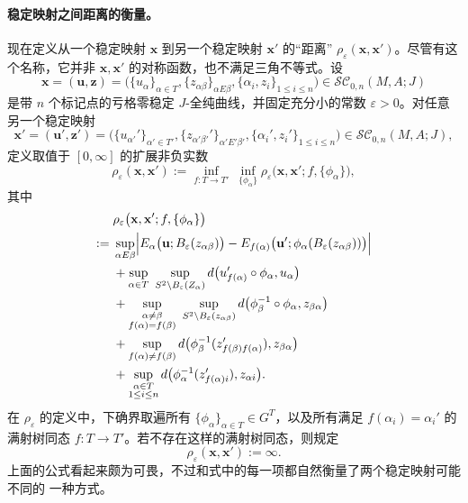 \paragraph{稳定映射之间距离的衡量。}
现在定义从一个稳定映射 $\mathbf x$ 到另一个稳定映射 $\mathbf x'$ 的“距离”
$\rho_\varepsilon(\mathbf x,\mathbf x')$。尽管有这个名称，它并非
$\mathbf x,\mathbf x'$ 的对称函数，也不满足三角不等式。设
\[
  \mathbf x=(\mathbf u,\mathbf z)
  =\bigl(\{u_\alpha\}_{\alpha\in T},
    \{z_{\alpha\beta}\}_{\alpha E\beta},
    \{\alpha_i,z_i\}_{1\le i\le n}\bigr)
  \in\mathcal{SC}_{0,n}(M,A;J)
\]
是带 $n$ 个标记点的亏格零稳定 $J$-全纯曲线，并固定充分小的常数
$\varepsilon>0$。对任意另一个稳定映射
\[
  \mathbf x'=(\mathbf u',\mathbf z')
  =\bigl(\{u_{\alpha'}'\}_{\alpha'\in T'},
    \{z_{\alpha'\beta'}'\}_{\alpha'E'\beta'},
    \{\alpha_i',z_i'\}_{1\le i\le n}\bigr)
  \in\mathcal{SC}_{0,n}(M,A;J),
\]
定义取值于 $[0,\infty]$ 的扩展非负实数
\[
  \rho_\varepsilon(\mathbf x,\mathbf x')
  :=\inf_{f:T\to T'}\ \inf_{\{\phi_\alpha\}}
  \rho_\varepsilon
  \bigl(\mathbf x,\mathbf x';f,\{\phi_\alpha\}\bigr),
\]
其中
\[
  \begin{aligned}
  &\rho_\varepsilon
    \bigl(\mathbf x,\mathbf x';f,\{\phi_\alpha\}\bigr)\\
  :={}&\sup_{\alpha E\beta}
    \Bigl|E_\alpha\bigl(\mathbf u;B_\varepsilon(z_{\alpha\beta})\bigr)
      -E_{f(\alpha)}\bigl(
        \mathbf u';\phi_\alpha(B_\varepsilon(z_{\alpha\beta}))\bigr)\Bigr|\\
  &+\sup_{\alpha\in T}\ 
    \sup_{S^2\setminus B_\varepsilon(Z_\alpha)}
    d\bigl(u_{f(\alpha)}'\circ\phi_\alpha,u_\alpha\bigr)\\
  &+\sup_{\substack{\alpha\ne\beta\\f(\alpha)=f(\beta)}}\ 
    \sup_{S^2\setminus B_\varepsilon(z_{\alpha\beta})}
    d\bigl(\phi_\beta^{-1}\circ\phi_\alpha,z_{\beta\alpha}\bigr)\\
  &+\sup_{f(\alpha)\ne f(\beta)}
    d\bigl(\phi_\beta^{-1}(z_{f(\beta)f(\alpha)}'),z_{\beta\alpha}\bigr)\\
  &+\sup_{\substack{\alpha\in T\\1\le i\le n}}
    d\bigl(\phi_\alpha^{-1}(z_{f(\alpha)i}'),z_{\alpha i}\bigr).
  \end{aligned}
\]
在 $\rho_\varepsilon$ 的定义中，下确界取遍所有
$\{\phi_\alpha\}_{\alpha\in T}\in G^T$，以及所有满足
$f(\alpha_i)=\alpha_i'$ 的满射树同态 $f:T\to T'$。若不存在这样的满射树同态，则规定
\[
  \rho_\varepsilon(\mathbf x,\mathbf x'):=\infty.
\]
上面的公式看起来颇为可畏，不过和式中的每一项都自然衡量了两个稳定映射可能不同的
一种方式。

